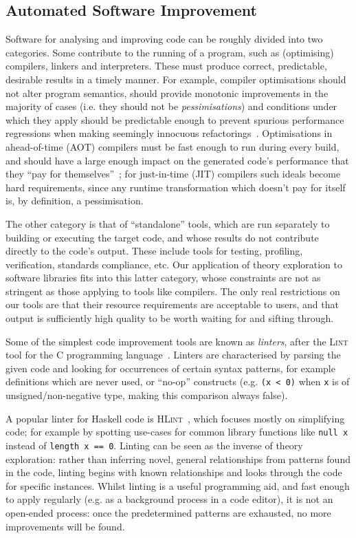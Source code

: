 \subsection{Automated Software Improvement}

Software for analysing and improving code can be roughly divided into two
categories. Some contribute to the running of a program, such as (optimising)
compilers, linkers and interpreters. These must produce correct, predictable,
desirable results in a timely manner. For example, compiler optimisations should
not alter program semantics, should provide monotonic improvements in the
majority of cases (i.e. they should not be \emph{pessimisations}) and conditions
under which they apply should be predictable enough to prevent spurious
performance regressions when making seemingly innocuous
refactorings~\cite{robison2001impact}. Optimisations in ahead-of-time (AOT)
compilers must be fast enough to run during every build, and should have a large
enough impact on the generated code's performance that they
``pay for themselves''~\cite{Franz1994}; for just-in-time (JIT) compilers such
ideals become hard requirements, since any runtime transformation which doesn't
pay for itself is, by definition, a pessimisation.

The other category is that of ``standalone'' tools, which are run separately to
building or executing the target code, and whose results do not contribute
directly to the code's output. These include tools for testing, profiling,
verification, standards compliance, etc. Our application of theory exploration
to software libraries fits into this latter category, whose constraints are not
as stringent as those applying to tools like compilers. The only real
restrictions on our tools are that their resource requirements are acceptable to
users, and that output is sufficiently high quality to be worth waiting for and
sifting through.

Some of the simplest code improvement tools are known as \emph{linters}, after
the \textsc{Lint} tool for the C programming language~\cite{Johnson78lint}.
Linters are characterised by parsing the given code and looking for occurrences
of certain syntax patterns, for example definitions which are never used, or
``no-op'' constructs (e.g. \texttt{(x < 0)} when \texttt{x} is of
unsigned/non-negative type, making this comparison always false).

A popular linter for Haskell code is \textsc{HLint}~\cite{mitchell2014hlint},
which focuses mostly on simplifying code; for example by spotting use-cases for
common library functions like \texttt{null x} instead of \texttt{length x == 0}.
Linting can be seen as the inverse of theory exploration: rather than inferring
novel, general relationships from patterns found in the code, linting begins
with known relationships and looks through the code for specific instances.
Whilst linting is a useful programming aid, and fast enough to apply regularly
(e.g. as a background process in a code editor), it is not an open-ended
process: once the predetermined patterns are exhausted, no more improvements
will be found.

